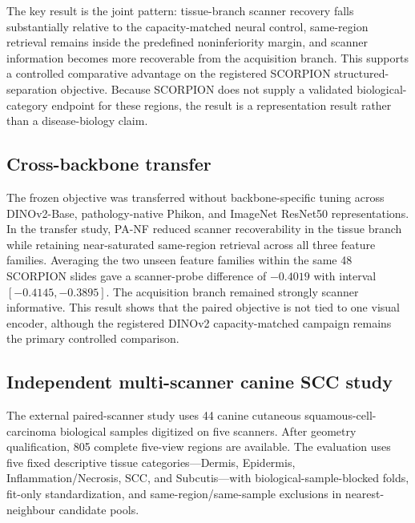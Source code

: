 The key result is the joint pattern: tissue-branch scanner recovery falls substantially relative to the capacity-matched neural control, same-region retrieval remains inside the predefined noninferiority margin, and scanner information becomes more recoverable from the acquisition branch. This supports a controlled comparative advantage on the registered SCORPION structured-separation objective. Because SCORPION does not supply a validated biological-category endpoint for these regions, the result is a representation result rather than a disease-biology claim.

\subsection{Cross-backbone transfer}
The frozen objective was transferred without backbone-specific tuning across DINOv2-Base, pathology-native Phikon, and ImageNet ResNet50 representations. In the transfer study, PA-NF reduced scanner recoverability in the tissue branch while retaining near-saturated same-region retrieval across all three feature families. Averaging the two unseen feature families within the same 48 SCORPION slides gave a scanner-probe difference of $-0.4019$ with interval $[-0.4145,-0.3895]$. The acquisition branch remained strongly scanner informative. This result shows that the paired objective is not tied to one visual encoder, although the registered DINOv2 capacity-matched campaign remains the primary controlled comparison.

\subsection{Independent multi-scanner canine SCC study}
The external paired-scanner study uses 44 canine cutaneous squamous-cell-carcinoma biological samples digitized on five scanners. After geometry qualification, 805 complete five-view regions are available. The evaluation uses five fixed descriptive tissue categories---Dermis, Epidermis, Inflammation/Necrosis, SCC, and Subcutis---with biological-sample-blocked folds, fit-only standardization, and same-region/same-sample exclusions in nearest-neighbour candidate pools.

